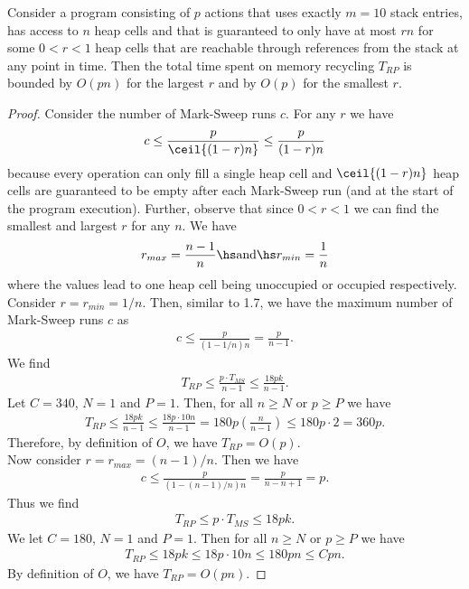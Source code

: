 \documentclass{article}
\begin{document}
\begin{claim}
    Consider a program consisting of $p$ actions that uses exactly $m=10$
    stack entries, has access to $n$ heap cells and that is guaranteed to only
    have at most $rn$ for some $0<r<1$ heap cells that are reachable through references
    from the stack at any point in time.
    Then the total time spent on memory recycling $T_{RP}$ is bounded by $O(pn)$ for
    the largest $r$ and by $O(p)$ for the smallest $r$.
\end{claim}

\begin{proof}
    Consider the number of Mark-Sweep runs $c$. For any $r$ we have
    \begin{align*}
        c \leq \frac{p}{\ceil{(1-r)n}}\leq \frac{p}{(1-r)n}
    \end{align*}
    because every operation can only fill a single heap cell and $\ceil{(1-r)n}$
    heap cells are guaranteed to be empty after each Mark-Sweep run
    (and at the start of the program execution). Further, observe that 
    since $0<r<1$ we can find the smallest and largest $r$ for any $n$. We have
    \begin{align}
        \label{rlims}
        r_{max} = \frac{n-1}{n} \hs\text{and}\hs r_{min} = \frac{1}{n}
    \end{align}
    where the values lead to one heap cell being unoccupied or occupied respectively.\\
    Consider $r=r_{min}=1/n$. Then, similar to 1.7, we have the maximum number of Mark-Sweep
    runs $c$ as
    \begin{align*}
        c \leq \frac{p}{\left(1-1/n\right)n}=\frac{p}{n-1}.
    \end{align*}
    We find
    \begin{align*}
        T_{RP} \leq \frac{p\cdot T_{MS}}{n-1} \leq \frac{18pk}{n-1}.
    \end{align*}
    Let $C=340$, $N=1$ and $P=1$. Then, for all $n\geq N$ or $p\geq P$ we have
    \begin{align*}
        T_{RP} \leq \frac{18pk}{n-1} \leq \frac{18p\cdot 10n}{n-1} = 180p\left(\frac{n}{n-1}\right)
        \leq 180p\cdot 2 = 360p.
    \end{align*}
    Therefore, by definition of $O$, we have $T_{RP}=O(p)$.\\
    Now consider $r=r_{max}=(n-1)/n$. Then we have
    \begin{align}
        \label{cmax}
        c\leq \frac{p}{(1-(n-1)/n)n} = \frac{p}{n-n+1} = p.
    \end{align}
    Thus we find
    \begin{align*}
        T_{RP} \leq p\cdot T_{MS} \leq 18pk.
    \end{align*}
    We let $C=180$, $N=1$ and $P=1$. Then for all $n\geq N$ or $p\geq P$ we have
    \begin{align*}
        T_{RP} \leq 18pk \leq 18p \cdot 10n \leq 180pn \leq Cpn.
    \end{align*}
    By definition of $O$, we have $T_{RP}=O(pn)$. 
\end{proof}
\end{document}
